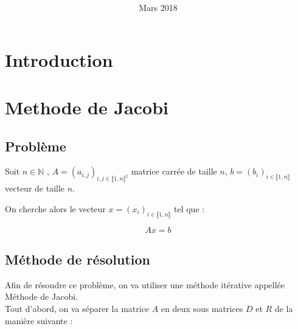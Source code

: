 \documentclass[11pt, a4paper]{article}
\title{
\LARGE{\textbf{\hmwkClass}}\\
\vspace{0.5in}
\large{\textbf{\hmwkTitle}}
\vspace{3in}
}
\author{\textbf{\hmwkAuthorName}}
\date{Mars 2018} %
\begin{document}
\maketitle



\newpage
\tableofcontents
\newpage

\section{Introduction}

\section{Methode de Jacobi}

\subsection{Problème}

Soit $n \in \mathbb{N}$ , $A = (a_{i,j})_{i,j \in \llbracket 1,n \rrbracket^2}$ matrice carrée de taille $n$, $b = (b_i)_{i \in \llbracket 1,n \rrbracket}$ vecteur de taille $n$.

On cherche alors le vecteur $x = (x_i)_{i \in \llbracket 1,n \rrbracket}$ tel que :

\begin{equation} 
    \label{eq:probleme}
    Ax = b
\end{equation}

\subsection{Méthode de résolution}

Afin de résoudre ce problème, on va utiliser une méthode itérative appellée Méthode de Jacobi.\\

Tout d'abord, on va séparer la matrice $A$ en deux sous matrices $D$ et $R$ de la manière suivante :\\
\end{document}
